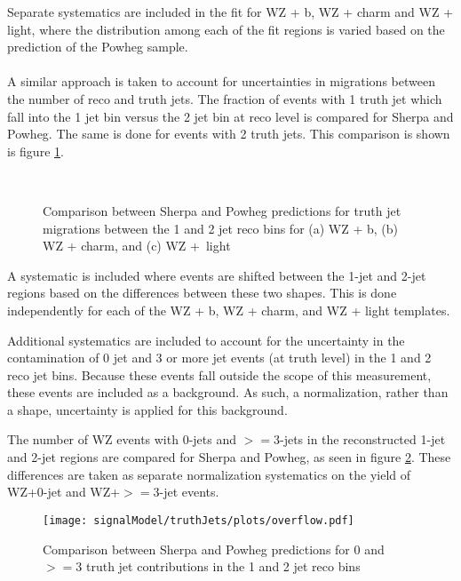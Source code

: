 Separate systematics are included in the fit for WZ + b, WZ + charm and WZ + light, where the distribution among each of the fit regions is varied based on the prediction of the Powheg sample.

\paragraph{}
A similar approach is taken to account for uncertainties in migrations between the number of reco and truth jets. The fraction of events with 1 truth jet which fall into the 1 jet bin versus the 2 jet bin at reco level is compared for Sherpa and Powheg. The same is done for events with 2 truth jets. This comparison is shown is figure \ref{fig:migration12}.

\begin{figure}[H]
    \centering
    \\
    \caption{Comparison between Sherpa and Powheg predictions for truth jet migrations between the 1 and 2 jet reco bins for (a) WZ + b, (b) WZ + charm, and (c) WZ +\ light}
\label{fig:migration12}
\end{figure}

A systematic is included where events are shifted between the 1-jet and 2-jet regions based on the differences between these two shapes. This is done independently for each of the WZ + b, WZ + charm, and WZ + light templates.

Additional systematics are included to account for the uncertainty in the contamination of 0 jet and 3 or more jet events (at truth level) in the 1 and 2 reco jet bins. Because these events fall outside the scope of this measurement, these events are included as a background. As such, a normalization, rather than a shape, uncertainty is applied for this background.

The number of WZ events with 0-jets and $>=$3-jets in the reconstructed 1-jet and 2-jet regions are compared for Sherpa and Powheg, as seen in figure \ref{fig:overflow}. These differences are taken as separate normalization systematics on the yield of WZ+0-jet and WZ+$>=$3-jet events.

\begin{figure}[H]
    \centering
    \texttt{[image: signalModel/truthJets/plots/overflow.pdf]}
    \caption{Comparison between Sherpa and Powheg predictions for 0 and $>=$3 truth jet contributions in the 1 and 2 jet reco bins}
\label{fig:overflow}
\end{figure} 
